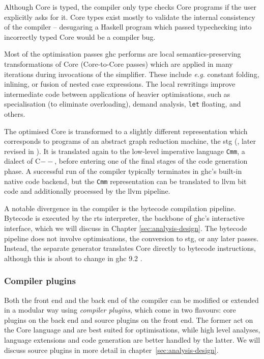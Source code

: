 \documentclass[thesis=B,english]{FITthesis}[2019/12/23]
\newcommand{\eg}{\emph{e.g.}\xspace}
\newcommand{\hsCode}[1]{\texttt{#1}}
\begin{document}
Although Core is typed, the compiler only type checks Core programs if the user
explicitly asks for it. Core types exist mostly to validate the internal
consistency of the compiler -- desugaring a Haskell program which passed
typechecking into incorrectly typed Core would be a compiler bug.

Most of the optimisation passes \acrshort{ghc} performs are local
semantics-pre\-serv\-ing transformations of Core (Core-to-Core passes) which
are applied in many iterations during invocations of the
simplifier\cite{cmtary-core2core}. These include \eg constant folding,
inlining, or fusion of nested case expressions. The local rewritings improve
intermediate code between applications of heavier optimisations, such as
specialisation (to eliminate overloading), demand analysis, \hsCode{let}
floating, and others.

The optimised Core is transformed to a slightly different representation which
corresponds to programs of an abstract graph reduction machine, the
\acrfull{stg} (\cite{stg-classic}, later revised in \cite{stg2}). It is
translated again to the low-level imperative language \texttt{Cmm}, a dialect
of C$--$, before entering one of the final stages of the code generation phase.
A successful run of the compiler typically terminates in \acrshort{ghc}'s
built-in native code back\-end, but the \texttt{Cmm} representation can be
translated to \acrshort{llvm} bit code and additionally processed by the
\acrshort{llvm} pipeline.

A notable divergence in the compiler is the bytecode compilation pipeline.
Bytecode is executed by the \acrshort{rts} interpreter, the backbone of
\acrshort{ghc}'s interactive interface, which we will discuss in Chapter
\ref{sec:analysis-design}. The bytecode pipeline does not involve
optimisations, the conversion to \acrshort{stg}, or any later passes. Instead,
the separate generator translates Core directly to bytecode instructions,
although this is about to change in \acrshort{ghc} 9.2
\cite{mr-ghci-stg-unboxed}.

\subsubsection*{Compiler plugins}
Both the front end and the back end of the compiler can be modified or extended
in a modular way using \textit{compiler plugins}, which come in two flavours:
core plugins on the back end and source plugins on the front
end\cite{ghc-source-plugins}. The former act on the Core language and are best
suited for optimisations, while high level analyses, language extensions and
code generation are better handled by the latter. We will discuss source
plugins in more detail in chapter~\ref{sec:analysis-design}.
\end{document}
